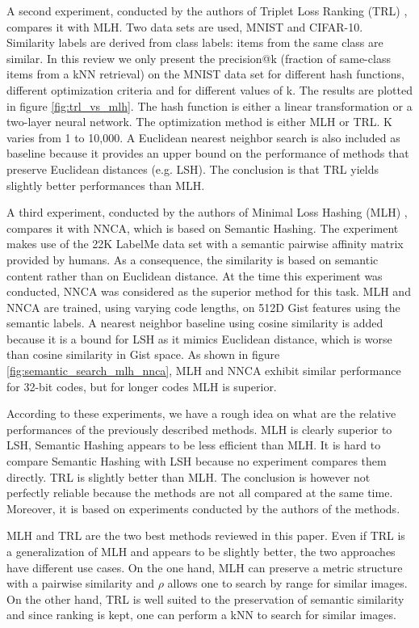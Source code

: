 A second experiment, conducted by the authors of Triplet Loss Ranking (TRL) \cite{norouzi2012hamming}, compares it with MLH. Two data sets are used, MNIST and CIFAR-10. Similarity labels are derived from class labels: items from the same class are similar. In this review we only present the precision@k (fraction of same-class items from a kNN retrieval) on the MNIST data set for different hash functions, different optimization criteria and for different values of k. The results are plotted in figure \ref{fig:trl_vs_mlh}. The hash function is either a linear transformation or a two-layer neural network. The optimization method is either MLH or TRL. K varies from 1 to 10,000. A Euclidean nearest neighbor search is also included as baseline because it provides an upper bound on the performance of methods that preserve Euclidean distances (e.g. LSH). The conclusion is that TRL yields slightly better performances than MLH.

A third experiment, conducted by the authors of Minimal Loss Hashing (MLH) \cite{norouzi2011minimal}, compares it with NNCA, which is based on Semantic Hashing. The experiment makes use of the 22K LabelMe data set with a semantic pairwise affinity matrix provided by humans. As a consequence, the similarity is based on semantic content rather than on Euclidean distance. At the time this experiment was conducted, NNCA was considered as the superior method for this task. MLH and NNCA are trained, using varying code lengths, on 512D Gist features using the semantic labels. A nearest neighbor baseline using cosine similarity is added because it is a bound for LSH as it mimics Euclidean distance, which is worse than cosine similarity in Gist space. As shown in figure \ref{fig:semantic_search_mlh_nnca}, MLH and NNCA exhibit similar performance for 32-bit codes, but for longer codes MLH is superior.

According to these experiments, we have a rough idea on what are the relative performances of the previously described methods. MLH is clearly superior to LSH, Semantic Hashing appears to be less efficient than MLH. It is hard to compare Semantic Hashing with LSH because no experiment compares them directly. TRL is slightly better than MLH. The conclusion is however not perfectly reliable because the methods are not all compared at the same time. Moreover, it is based on experiments conducted by the authors of the methods.

MLH and TRL are the two best methods reviewed in this paper. Even if TRL is a generalization of MLH and appears to be slightly better, the two approaches have different use cases. On the one hand, MLH can preserve a metric structure with a pairwise similarity and $\rho$ allows one to search by range for similar images. On the other hand, TRL is well suited to the preservation of semantic similarity and since ranking is kept, one can perform a kNN to search for similar images.

